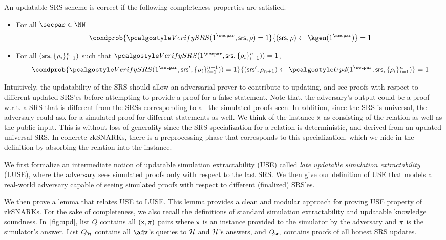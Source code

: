 \begin{definition}
	An updatable SRS scheme is correct if the following completeness properties are satisfied.
	
	\begin{itemize}
		
		\item
		For all $\secpar \in \NN$
		\[
		\condprob{\verifyCRS(1^\secpar,\srs,\rho) = 1}{(\srs,\rho) \leftarrow \kgen(1^\secpar)} = 1
		\]
		\item
		
		For all $(\mathsf{srs},\{\rho_i \}_{i=1}^n)$ such that $\verifyCRS(1^\secpar,\srs,\{\rho_i \}_{i=1}^n))=1$,
		\[
		\condprob{\verifyCRS(1^\secpar,\srs',\{\rho_i \}_{i=1}^{n+1}))=1}{(\srs',\rho_{n+1}) \leftarrow \upd(1^\secpar,\srs,\{\rho_i \}_{i=1}^n)} = 1
		\]
		
	\end{itemize}
\end{definition} 


Intuitively, the updatability of the SRS should allow an adversarial prover to contribute to updating, and see proofs with respect to different updated SRS'es before attempting to provide a proof for a false statement. Note that, the adversary's output could be a proof w.r.t. a SRS that is different from the SRSs corresponding to all the simulated proofs seen. In addition, since the SRS is universal, the adversary could ask for a simulated proof for different statements as well. We think of the instance $\mathsf{x}$ as consisting of the relation as well as the public input. This is without loss of generality since the SRS specialization for a relation is deterministic, and derived from an updated universal SRS. In concrete zkSNARKs, there is a preprocessing phase that corresponds to this specialization, which we hide in the definition by absorbing the relation into the instance.

We first formalize an intermediate notion of updatable simulation extractability (USE) called \emph{late updatable simulation extractability} (LUSE), where the adversary sees simulated proofs only with respect to the last SRS. We then give our definition of USE that models a real-world adversary capable of seeing simulated proofs with respect to different (finalized) SRS'es.

We then prove a lemma that relates USE to LUSE. This lemma provides a clean and modular approach for proving USE property of zkSNARKs. 
For the sake of completeness, we also recall the definitions of standard simulation extractability and updatable knowledge soundness.
In~\cref{fig:upd}, list $Q$ contains all $(\mathsf{x}, \pi)$ pairs where
$\mathsf{x}$ is an instance provided to the simulator by the adversary and
$\pi$ is the simulator's answer. List $Q_{\mathcal{H}}$ contains all $\advse$'s
queries to $\mathcal{H}$ and $\mathcal{H}$'s answers, and $Q_{\mathsf{srs}}$ contains proofs of all honest SRS updates.


